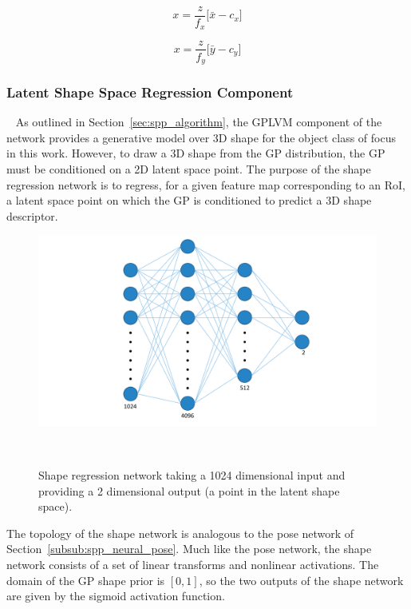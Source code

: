 \begin{equation}
  \label{eqn:spp_x_3d}
  x = \frac{z}{f_{x}} \Big[ \bar{x} - c_{x} \Big]
\end{equation}

\begin{equation}
  \label{eqn:spp_y_3d}
  x = \frac{z}{f_{y}} \Big[ \bar{y} - c_{y} \Big]
\end{equation}

\subsubsection{Latent Shape Space Regression Component}
~\label{subsub:spp_neural_latent}
As outlined in Section~\ref{sec:spp_algorithm}, the GPLVM component of the network provides 
a generative model over 3D shape for the object class of focus in this work. However, to draw 
a 3D shape from the GP distribution, the GP must be conditioned on a 2D latent space 
point. The purpose of the shape regression network is to regress, for a given feature map corresponding 
to an RoI, a latent space point on which the GP is conditioned to predict a 3D shape descriptor.

\begin{figure}[!htbp]
  \centering
  \includegraphics[width=.8\linewidth]{figures/spp/shape_net_diagram.pdf}
  \caption[Shape Regression Network]{Shape regression network taking a 1024 dimensional 
  input and providing a 2 dimensional output (a point in the latent shape space).}
~\label{figure:spp_shape_block}
\end{figure}

The topology of the shape network is analogous to the pose network of Section~\ref{subsub:spp_neural_pose}. 
Much like the pose network, the shape network consists of a set of linear transforms and nonlinear 
activations. The domain of the GP shape prior is \( [0, 1] \), so the two outputs of the shape network 
are given by the sigmoid activation function.

